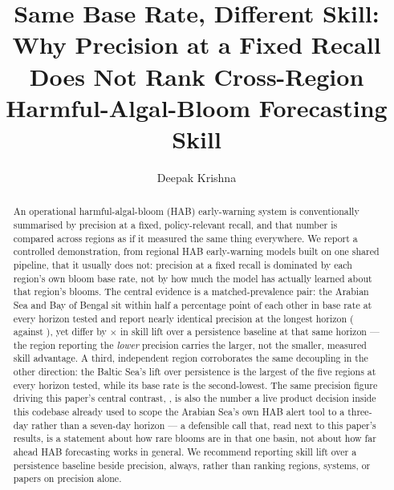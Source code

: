 \documentclass[runningheads]{llncs}
\begin{document}
\title{Same Base Rate, Different Skill: Why Precision at a Fixed Recall Does
Not Rank Cross-Region Harmful-Algal-Bloom Forecasting Skill}


\author{Deepak Krishna}

\maketitle

\begin{abstract}
An operational harmful-algal-bloom (HAB) early-warning system is
conventionally summarised by precision at a fixed, policy-relevant recall,
and that number is compared across regions as if it measured the same thing
everywhere. We report a controlled demonstration, from \NRegions{} regional
HAB early-warning models built on one shared pipeline, that it usually does
not: precision at a fixed recall is dominated by each region's own bloom
base rate, not by how much the model has actually learned about that
region's blooms. The central evidence is a matched-prevalence pair: the
Arabian Sea and Bay of Bengal sit within half a percentage point of each
other in base rate at every horizon tested and report nearly identical
precision at the longest horizon (\HabArabianPrecSeven{} against
\HabBengalPrecSeven{}), yet differ by \HabLiftRatioSeven{}$\times$ in skill
lift over a persistence baseline at that same horizon --- the region
reporting the \emph{lower} precision carries the larger, not the smaller,
measured skill advantage. A third, independent region corroborates the same
decoupling in the other direction: the Baltic Sea's lift over persistence is
the largest of the five regions at every horizon tested, while its base rate
is the second-lowest. The same precision figure driving this paper's central
contrast, \HabArabianPrecSeven{}, is also the number a live product decision
inside this codebase already used to scope the Arabian Sea's own HAB alert
tool to a three-day rather than a seven-day horizon --- a defensible call
that, read next to this paper's results, is a statement about how rare
blooms are in that one basin, not about how far ahead HAB forecasting works
in general. We recommend reporting skill lift over a persistence baseline
beside precision, always, rather than ranking regions, systems, or papers on
precision alone.
\end{abstract}
\end{document}
